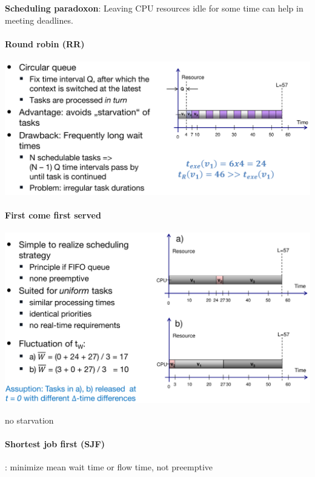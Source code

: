 \documentclass[english]{latex4ei/latex4ei_sheet}
\begin{document}
\textbf{Scheduling paradoxon}: Leaving CPU resources idle for some time can help in meeting deadlines.

\paragraph{Round robin (RR)}

\begin{center}
  \centering
  \includegraphics[width=\linewidth]{assets/RoundRobin.png}
  \label{fig:roundrobin}
\end{center}


\paragraph{First come first served}
\begin{center}
  \centering
  \includegraphics[width=\linewidth]{assets/FistComeFirstServed.png}
  \label{fig:fistcomefirstserved}
\end{center}

no starvation
 
\paragraph{Shortest job first (SJF)}: minimize mean wait time or flow time, not preemptive
\end{document}
